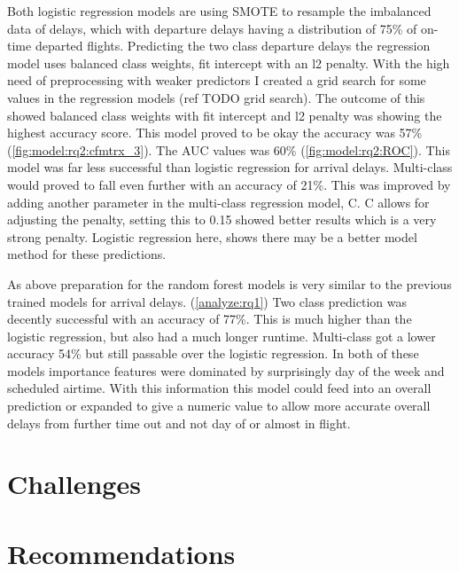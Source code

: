 \documentclass[a4paper,12pt]{article}
\begin{document}
Both logistic regression models are using SMOTE to resample the imbalanced data of delays, which with departure delays having a distribution of 
75\% of on-time departed flights. Predicting the two class departure delays the regression model uses balanced class weights, fit intercept with an l2 penalty.
With the high need of preprocessing with weaker predictors I created a grid search for some values in the regression models (ref TODO grid search).
The outcome of this showed balanced class weights with fit intercept and l2 penalty was showing the highest accuracy score. This model proved to be okay the accuracy was 57\% (\ref{fig:model:rq2:cfmtrx_3}).
The AUC values was 60\% (\ref{fig:model:rq2:ROC}). This model was far less successful than logistic regression for arrival delays. Multi-class would proved to fall even further with an accuracy of 21\%.
This was improved by adding another parameter in the multi-class regression model, C. C allows for adjusting the penalty, setting this to 0.15 showed better results which is a very
strong penalty. Logistic regression here, shows there may be a better model method for these predictions.

As above preparation for the random forest models is very similar to the previous trained models for arrival delays. (\ref{analyze:rq1})
Two class prediction was decently successful with an accuracy of 77\%. This is much higher than the logistic regression, but also had a much longer runtime.
Multi-class got a lower accuracy 54\% but still passable over the logistic regression. In both of these models importance features were dominated by surprisingly day of the week 
and scheduled airtime. With this information this model could feed into an overall prediction or expanded to give a numeric value to allow more accurate overall delays from further time out and not 
day of or almost in flight.


\pagebreak

\section{Challenges}

\pagebreak

\section{Recommendations}
\end{document}
